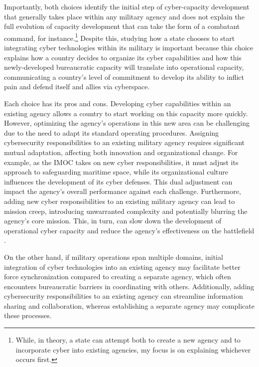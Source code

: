 \documentclass[12pt, letterpaper]{article}
\renewcommand{\baselinestretch}{1.35}
\let\oldfootnote\footnote
\renewcommand\footnote[1]{\oldfootnote{%
		\renewcommand\baselinestretch{.8}%
		\large\footnotesize\ignorespaces#1}} \addtolength{\footnotesep}{3pt}
\theoremstyle{plain}
\theoremstyle{remark}
\begin{document}
Importantly, both choices identify the initial step of cyber-capacity development that generally takes place within any military agency and does not explain the full evolution of capacity development that can take the form of a combatant command, for instance.\footnote{
        While, in theory, a state can attempt both to create a new agency and to incorporate cyber into existing agencies, my focus is on explaining whichever occurs first.
	}
Despite this, studying how a state chooses to start integrating cyber technologies within its military is important because this choice explains how a country decides to organize its cyber capabilities and how this newly-developed 
bureaucratic capacity will translate into operational capacity, 
communicating a country’s level of commitment to develop its ability to inflict pain and defend itself and allies via cyberspace. 


Each choice has its pros and cons. Developing cyber capabilities within an existing agency allows a country to start working on this capacity more quickly. However, optimizing the agency's operations in this new area can be challenging due to the need to adapt its standard operating procedures. Assigning cybersecurity responsibilities to an existing military agency requires significant mutual adaptation, affecting both innovation and organizational change. For example, as the IMOC takes on new cyber responsibilities, it must adjust its approach to safeguarding maritime space, while its organizational culture influences the development of its cyber defenses. This dual adjustment can impact the agency's overall performance against each challenge.
Furthermore, adding new cyber responsibilities to an existing military agency can lead to mission creep, introducing unwarranted complexity and potentially blurring the agency's core mission. This, in turn, can slow down the development of operational cyber capacity and reduce the agency's effectiveness on the battlefield \citep{Kostyuk2022TNSR}.

On the other hand, if military operations span multiple domains, initial integration of cyber technologies into an existing agency may facilitate better force synchronization compared to creating a separate agency, which often encounters bureaucratic barriers in coordinating with others. Additionally, adding cybersecurity responsibilities to an existing agency can streamline information sharing and collaboration, whereas establishing a separate agency may complicate these processes.
\end{document}
